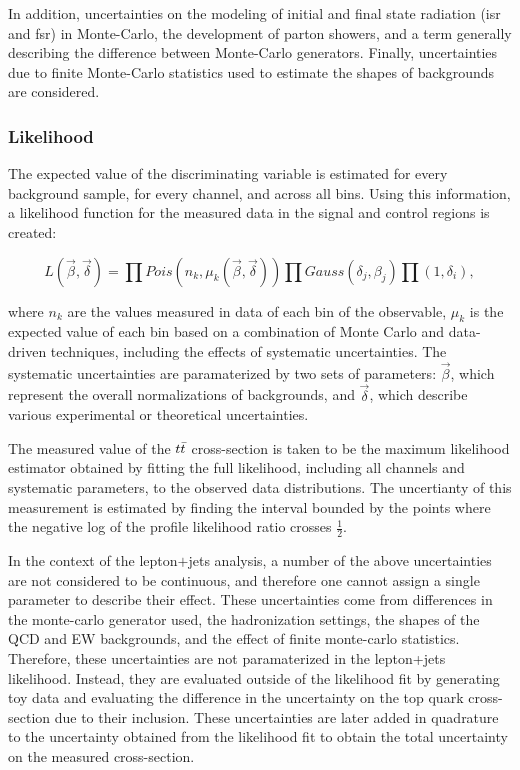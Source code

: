 In addition, uncertainties on the modeling of initial and final state radiation (isr and fsr) in Monte-Carlo, the development of parton showers, and a term generally describing the difference between Monte-Carlo generators.
Finally, uncertainties due to finite Monte-Carlo statistics used to estimate the shapes of backgrounds are considered.

%


\subsubsection{Likelihood}

The expected value of the discriminating variable is estimated for every background sample, for every channel, and across all bins.
Using this information, a likelihood function for the measured data in the signal and control regions is created:

\begin{equation}
  L(\vec{\beta}, \vec{\delta}) = \prod Pois(n_{k},\mu_{k}(\vec{\beta},\vec{\delta})) \prod Gauss(\delta_j, \beta_j) \prod( 1, \delta_i),
\end{equation}

where $n_k$ are the values measured in data of each bin of the observable, $\mu_k$ is the expected value of each bin based on a combination of Monte Carlo and data-driven techniques, including the effects of systematic uncertainties.
The systematic uncertainties are paramaterized by two sets of parameters: $\vec{\beta}$, which represent the overall normalizations of backgrounds, and $\vec{\delta}$, which describe various experimental or theoretical uncertainties.

The measured value of the $t\bar{t}$ cross-section is taken to be the maximum likelihood estimator obtained by fitting the full likelihood, including all channels and systematic parameters, to the observed data distributions.
The uncertianty of this measurement is estimated by finding the interval bounded by the points where the negative log of the profile likelihood ratio crosses $\frac{1}{2}$.

In the context of the lepton$+$jets analysis, a number of the above uncertainties are not considered to be continuous, and therefore one cannot assign a single parameter to describe their effect.
These uncertainties come from differences in the monte-carlo generator used, the hadronization settings, the shapes of the QCD and EW backgrounds, and the effect of finite monte-carlo statistics.
Therefore, these uncertainties are not paramaterized in the lepton+jets likelihood.
Instead, they are evaluated outside of the likelihood fit by generating toy data and evaluating the difference in the uncertainty on the top quark cross-section due to their inclusion.
These uncertainties are later added in quadrature to the uncertainty obtained from the likelihood fit to obtain the total uncertainty on the measured cross-section.


